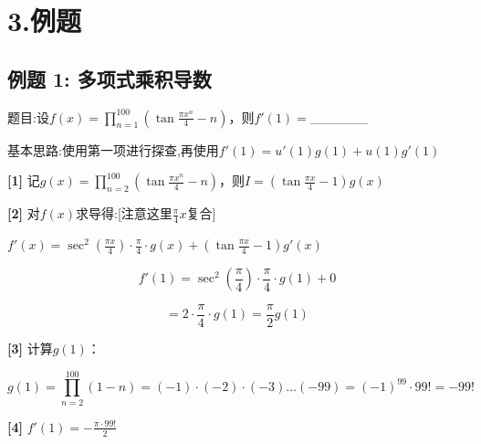 \documentclass[11pt,a4paper,UTF8]{ctexart}
\begin{document}
\pagestyle{fancy}
\fancyhf{}
\fancyhead[R]{\small\color{TitlePurple}\nouppercase{\leftmark}}
\renewcommand{\headrulewidth}{0.5pt}

\tableofcontents
\newpage
{}


\section{3.例题}


\subsection{例题 1: 多项式乘积导数}

题目:设$f(x) = \prod_{n=1}^{100} \left(\tan \frac{\pi x^n}{4} - n\right)$，则$f'(1) =$\_\_\_\_\_\_

基本思路:使用第一项进行探查,再使用$f'(1) = u'(1)g(1) + u(1)g'(1)$

\begin{solbox}[分步推导与答题规范]
\textbf{[1]} 记$g(x) = \prod_{n=2}^{100} \left(\tan \frac{\pi x^n}{4} - n\right)$，则$I = \left(\tan \frac{\pi x}{4} - 1\right) g(x)$

\textbf{[2]} 对$f(x)$求导得:[注意这里$\frac{\pi}{4}x$复合]

$f'(x) = \sec^2\left(\frac{\pi x}{4}\right) \cdot \frac{\pi}{4} \cdot g(x) + \left(\tan \frac{\pi x}{4} - 1\right) g'(x)$


\begin{equation*}
f'(1) = \sec^2\left(\frac{\pi}{4}\right) \cdot \frac{\pi}{4} \cdot g(1) +0
\end{equation*}


      
\begin{equation*}
= 2 \cdot \frac{\pi}{4} \cdot g(1) = \frac{\pi}{2} g(1)
\end{equation*}


\textbf{[3]} 计算$g(1)$：


\begin{equation*}
g(1) = \prod_{n=2}^{100} (1 - n) = (-1) \cdot (-2) \cdot (-3) \dots (-99) = (-1)^{99} \cdot 99! = -99!
\end{equation*}


\textbf{[4]} $f'(1) = -\frac{\pi \cdot 99!}{2}$
\end{solbox}
\end{document}
